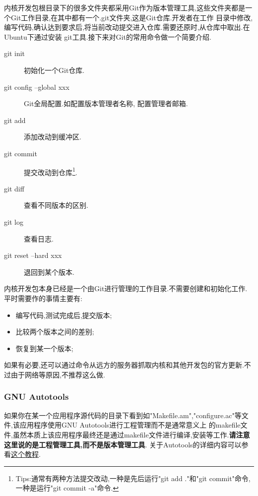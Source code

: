 \documentclass[12pt,a4paper,titlepage]{article}
\begin{document}
内核开发包根目录下的很多文件夹都采用Git作为版本管理工具,这些文件夹都是一个Git工作目录,在其中都有一个.git文件夹,这是Git仓库.开发者在工作
目录中修改,编写代码,确认达到要求后,将当前改动提交进入仓库.需要还原时,从仓库中取出.在Ubuntu下通过安装
git工具.接下来对Git的常用命令做一个简要介绍.
\begin{description}
\item[git init] 初始化一个Git仓库.
\item[git config --global xxx] Git全局配置.如配置版本管理者名称,
配置管理者邮箱.
\item[git add ] 添加改动到缓冲区.
\item[git commit] 提交改动到仓库\footnote{Tips:通常有两种方法提交改动,一种是先后运行"git add ."和"git commit"命令,
一种是运行"git commit -a"命令.}.
\item[git diff] 查看不同版本的区别.
\item[git log] 查看日志.
\item[git reset --hard xxx] 退回到某个版本.
\end{description}
内核开发包本身已经是一个由Git进行管理的工作目录.不需要创建和初始化工作.平时需要作的事情主要有:
\begin{itemize}
\item 编写代码,测试完成后,提交版本;
\item 比较两个版本之间的差别;
\item 恢复到某一个版本;
\end{itemize}
如果有必要,还可以通过命令从远方的服务器抓取内核和其他开发包的官方更新.不过由于网络等原因,不推荐这么做.
\subsubsection{GNU Autotools}
如果你在某一个应用程序源代码的目录下看到如"Makefile.am","configure.ac"等文件,该应用程序使用GNU Autotools进行工程管理而不是通常意义上
的makefile文件,虽然本质上该应用程序最终还是通过makefile文件进行编译,安装等工作.\textbf{请注意这里说的是工程管理工具,而不是版本管理工具}.
关于Autotools的详细内容可以参看\href{http://www.lrde.epita.fr/~adl/autotools.html}{这个教程}.
\end{document}
